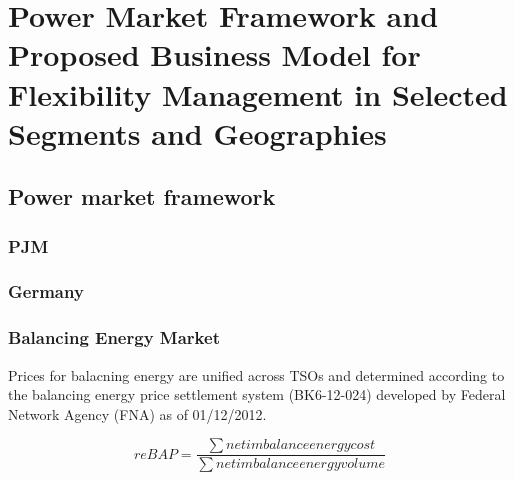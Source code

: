 \chapter{Power Market Framework and Proposed Business Model for Flexibility Management in Selected Segments and Geographies}
\label{ch:market}
\section{Power market framework}

\subsection{PJM}

\subsection{Germany}
\label{market:germany}

\subsection{Balancing Energy Market}



Prices for balacning energy are unified across TSOs and determined according to the  balancing energy price settlement system (BK6-12-024) developed by Federal Network Agency (FNA) as of 01/12/2012.

\begin{equation}
reBAP = \frac{\sum net imbalance energy cost}{\sum net imbalance energy volume}
\end{equation}